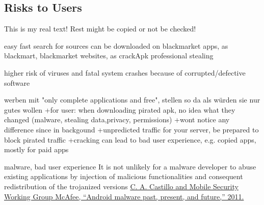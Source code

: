 \subsection{Risks to Users} \label{subsection:foundation-piracy-users}
This is my real text! Rest might be copied or not be checked!

easy fast search for sources
can be downloaded on blackmarket apps, as blackmart\cite{blackmartStore}, blackmarket websites, as crackApk\cite{crackApk}
professional stealing

higher risk of viruses and fatal system crashes because of corrupted/defective software

werben mit "only complete applications and free", stellen so da als würden sie nur gutes wollen
+for user: when downloading pirated apk, no idea what they changed (malware, stealing data,privacy, permissions)\newline
+wont notice any difference since in backgound\newline
+unpredicted traffic for your server, be prepared to block pirated traffic\newline
+cracking can lead to bad user experience, e.g. copied apps, mostly for paid apps\newline

malware, bad user experience\newline
It is not unlikely for a malware developer to abuse existing applications by injection of malicious functionalities and consequent redistribution of the trojanized versions \url{C. A. Castillo and Mobile Security Working Group McAfee, “Android malware past, present, and future,” 2011.}
